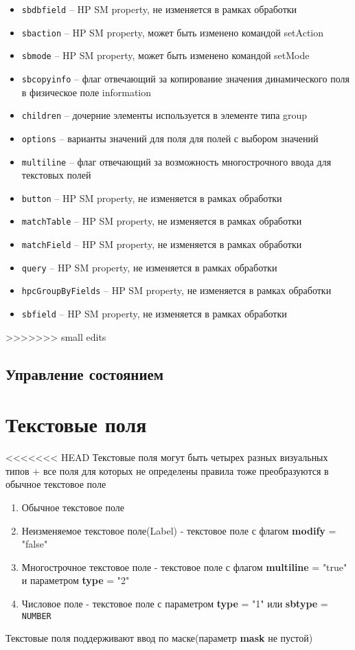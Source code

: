 \documentclass[../index.tex]{subfiles}
\begin{document}
\begin{itemize}
	\item \verb|sbdbfield| -- HP SM property, не изменяется в рамках обработки
	\item \verb|sbaction| -- HP SM property, может быть изменено командой setAction
	\item \verb|sbmode| -- HP SM property, может быть изменено командой setMode
	\item \verb|sbcopyinfo| -- флаг отвечающий за копирование значения динамического поля в физическое поле information 
	\item \verb|children| -- дочерние элементы используется в элементе типа group
	\item \verb|options| -- варианты значений для поля для полей с выбором значений
	\item \verb|multiline| -- флаг отвечающий за возможность многострочного ввода для текстовых полей
	\item \verb|button| -- HP SM property, не изменяется в рамках обработки
	\item \verb|matchTable| -- HP SM property, не изменяется в рамках обработки
	\item \verb|matchField| -- HP SM property, не изменяется в рамках обработки
	\item \verb|query| -- HP SM property, не изменяется в рамках обработки
	\item \verb|hpcGroupByFields| -- HP SM property, не изменяется в рамках обработки
	\item \verb|sbfield| -- HP SM property, не изменяется в рамках обработки
\end{itemize}
>>>>>>> small edits

\subsection{Управление состоянием}

\section{Текстовые поля}
<<<<<<< HEAD
    Текстовые поля могут быть четырех разных визуальных типов + все поля для которых не определены правила тоже преобразуются в обычное текстовое поле
    \begin{enumerate}
        \item Обычное текстовое поле
        \item Неизменяемое текстовое поле(Label) - текстовое поле с флагом \textbf{modify} = "false"
        \item Многострочное текстовое поле - текстовое поле с флагом \textbf{multiline} = "true" и параметром \textbf{type} = "2"
        \item Числовое поле - текстовое поле с параметром \textbf{type} = "1" или \textbf{sbtype} = \verb|NUMBER|
    \end{enumerate}
    Текстовые поля поддерживают ввод по маске(параметр \textbf{mask} не пустой)
\end{document}

